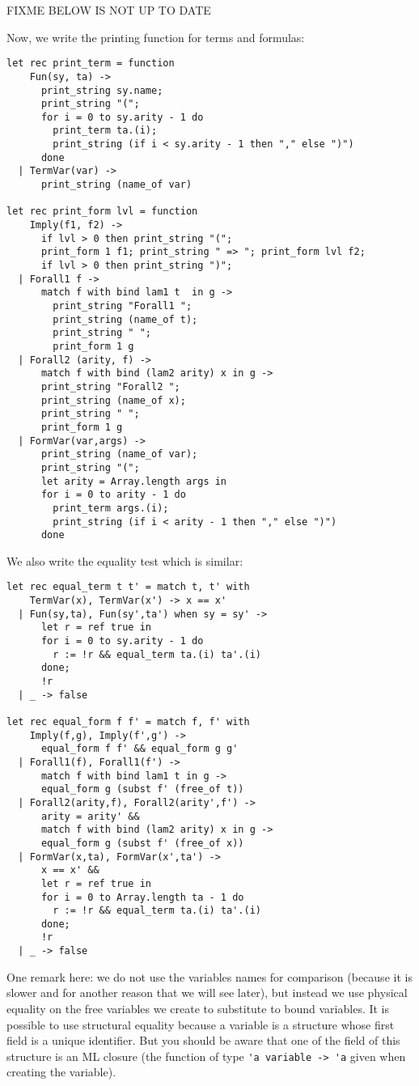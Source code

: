 \documentclass[11pt]{article}
\begin{document}
FIXME BELOW IS NOT UP TO DATE

Now, we write the printing function for terms and formulas:

\begin{verbatim}
let rec print_term = function
    Fun(sy, ta) ->
      print_string sy.name;
      print_string "(";
      for i = 0 to sy.arity - 1 do
        print_term ta.(i);
        print_string (if i < sy.arity - 1 then "," else ")")
      done
  | TermVar(var) ->
      print_string (name_of var)

let rec print_form lvl = function
    Imply(f1, f2) ->
      if lvl > 0 then print_string "(";
      print_form 1 f1; print_string " => "; print_form lvl f2;
      if lvl > 0 then print_string ")";
  | Forall1 f ->
      match f with bind lam1 t  in g ->
        print_string "Forall1 ";
        print_string (name_of t);
        print_string " ";
        print_form 1 g
  | Forall2 (arity, f) ->
      match f with bind (lam2 arity) x in g ->
      print_string "Forall2 ";
      print_string (name_of x);
      print_string " ";
      print_form 1 g
  | FormVar(var,args) ->
      print_string (name_of var);
      print_string "(";
      let arity = Array.length args in
      for i = 0 to arity - 1 do
        print_term args.(i);
        print_string (if i < arity - 1 then "," else ")")
      done
\end{verbatim}

We also write the equality test which is similar:
\begin{verbatim}
let rec equal_term t t' = match t, t' with
    TermVar(x), TermVar(x') -> x == x'
  | Fun(sy,ta), Fun(sy',ta') when sy = sy' ->
      let r = ref true in
      for i = 0 to sy.arity - 1 do
        r := !r && equal_term ta.(i) ta'.(i)
      done;
      !r
  | _ -> false

let rec equal_form f f' = match f, f' with
    Imply(f,g), Imply(f',g') ->
      equal_form f f' && equal_form g g'
  | Forall1(f), Forall1(f') ->
      match f with bind lam1 t in g ->
      equal_form g (subst f' (free_of t))
  | Forall2(arity,f), Forall2(arity',f') ->
      arity = arity' &&
      match f with bind (lam2 arity) x in g ->
      equal_form g (subst f' (free_of x))
  | FormVar(x,ta), FormVar(x',ta') ->
      x == x' &&
      let r = ref true in
      for i = 0 to Array.length ta - 1 do
        r := !r && equal_term ta.(i) ta'.(i)
      done;
      !r
  | _ -> false
\end{verbatim}

One remark here: we do not use the variables names for comparison
(because it is slower and for another reason that we will see later),
but instead we use physical equality on the free variables we create to substitute to
bound variables.
It is possible to use structural equality because a
variable is a structure whose first field is a unique identifier. But
you should be aware that one of the field of this structure is an ML
closure (the function of type \verb#'a variable -> 'a# given when
creating the variable).
\end{document}
